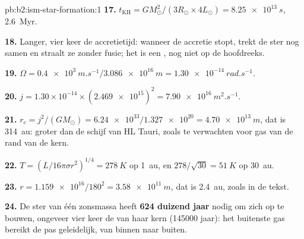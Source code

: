 \begin{solution}{pb:b2:ism-star-formation:1}
\textbf{17.} $t_{\mathrm{KH}} = GM_\odot^2/(3R_\odot\times4L_\odot) = \qty{8.25e13}{s}$,
\qty{2.6}{Myr}.

\textbf{18.} Langer, vier keer de accretietijd: wanneer de accretie stopt, trekt de ster
nog samen en straalt ze zonder fusie; het is een , nog niet op de
hoofdreeks.

\textbf{19.} $\Omega = \qty{0.4e3}{m.s^{-1}}/\qty{3.086e16}{m} = \qty{1.30e-14}{rad.s^{-1}}$.

\textbf{20.} $j = 1.30\times10^{-14}\times(\num{2.469e15})^2 = \qty{7.90e16}{m^2.s^{-1}}$.

\textbf{21.} $r_c = j^2/(GM_\odot) = \num{6.24e33}/\num{1.327e20} = \qty{4.70e13}{m}$, dat
is \qty{314}{au}: groter dan de schijf van HL Tauri, zoals te verwachten voor gas van de rand van de
kern.

\textbf{22.} $T = (L/16\pi\sigma r^2)^{1/4} = \qty{278}{K}$ op \qty{1}{au}, en
$278/\sqrt{30} = \qty{51}{K}$ op \qty{30}{au}.

\textbf{23.} $r = \num{1.159e16}/180^2 = \qty{3.58e11}{m}$, dat is \qty{2.4}{au}, zoals in de tekst.

\textbf{24.} De ster van één zonsmassa heeft
\textbf{\qty[text-series-to-math=true]{624}{} duizend jaar} nodig om zich op te bouwen, ongeveer vier
keer de  van haar kern (\num{145000} jaar): het buitenste gas bereikt de
 pas geleidelijk, van binnen naar buiten.
\end{solution}
